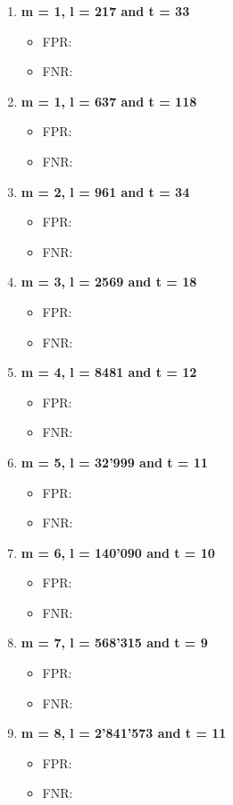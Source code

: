 \begin{enumerate}
    \item \textbf{m = 1, l = 217 and t = 33}
        \begin{itemize}
            \item FPR: 
            \item FNR: 
        \end{itemize}
    \item \textbf{m = 1, l = 637 and t = 118}
        \begin{itemize}
            \item FPR: 
            \item FNR: 
        \end{itemize}
    \item \textbf{m = 2, l = 961 and t = 34}
        \begin{itemize}
            \item FPR: 
            \item FNR: 
        \end{itemize}
    \item \textbf{m = 3, l = 2569 and t = 18}
        \begin{itemize}
            \item FPR: 
            \item FNR: 
        \end{itemize}
    \item \textbf{m = 4, l = 8481 and t = 12}
        \begin{itemize}
            \item FPR: 
            \item FNR: 
        \end{itemize}
    \item \textbf{m = 5, l = 32'999 and t = 11}
        \begin{itemize}
            \item FPR: 
            \item FNR: 
        \end{itemize}
    \item \textbf{m = 6, l = 140'090 and t = 10}
        \begin{itemize}
            \item FPR: 
            \item FNR: 
            
        \end{itemize}
    \item \textbf{m = 7, l = 568'315 and t = 9}
        \begin{itemize}
            \item FPR: 
            \item FNR: 
        \end{itemize}
    \item \textbf{m = 8, l = 2'841'573 and t = 11}
        \begin{itemize}
            \item FPR: 
            \item FNR: 
        \end{itemize}
\end{enumerate}

